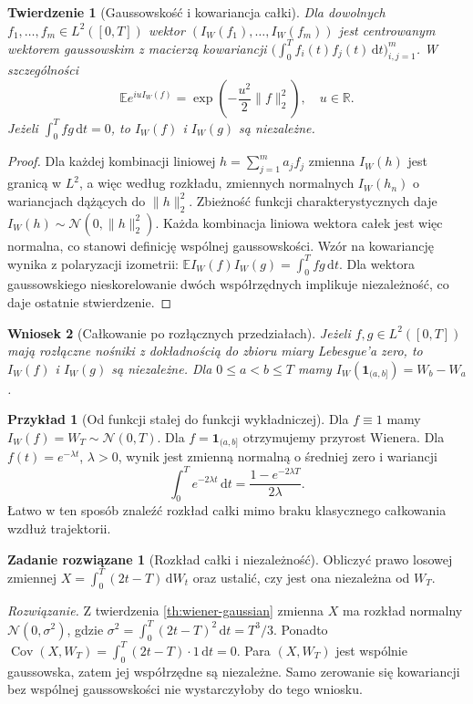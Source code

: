 \documentclass[11pt,a4paper,oneside]{report}
\numberwithin{equation}{chapter}
\theoremstyle{plain}
\newtheorem{twierdzenie}{Twierdzenie}[chapter]
\newtheorem{wniosek}[twierdzenie]{Wniosek}
\theoremstyle{definition}
\newtheorem{przyklad}{Przykład}[chapter]
\newtheorem{zadanie}{Zadanie rozwiązane}[chapter]
\theoremstyle{remark}
\newcommand{\R}{\mathbb{R}}
\newcommand{\E}{\mathbb{E}}
\newcommand{\Cov}{\operatorname{Cov}}
\newcommand{\ind}[1]{\mathbf{1}_{#1}}
\newcommand{\dd}{\mathrm{d}}
\newcommand{\norm}[1]{\lVert #1\rVert}
\newcommand{\Normal}{\mathcal{N}}
\begin{document}
\begin{twierdzenie}[Gaussowskość i kowariancja całki]\label{thm:volIII:01:03}\label{th:wiener-gaussian}
Dla dowolnych $f_1,\ldots,f_m\in L^2([0,T])$ wektor
$(I_W(f_1),\ldots,I_W(f_m))$ jest centrowanym wektorem gaussowskim
z macierzą kowariancji
$\big(\int_0^T f_i(t)f_j(t)\,\dd t\big)_{i,j=1}^m$.
W szczególności
\[
\E e^{iuI_W(f)}=\exp\left(-\frac{u^2}{2}\norm{f}_2^2\right),
\quad u\in\R.
\tag{1.4}
\]
Jeżeli $\int_0^Tfg\,\dd t=0$, to $I_W(f)$ i $I_W(g)$
są niezależne.
\end{twierdzenie}
\begin{proof}
Dla każdej kombinacji liniowej $h=\sum_{j=1}^ma_jf_j$
zmienna $I_W(h)$ jest granicą w $L^2$, a więc według
rozkładu, zmiennych normalnych $I_W(h_n)$ o wariancjach
dążących do $\norm{h}_2^2$. Zbieżność funkcji
charakterystycznych daje $I_W(h)\sim\Normal(0,\norm{h}_2^2)$.
Każda kombinacja liniowa wektora całek jest więc normalna,
co stanowi definicję wspólnej gaussowskości. Wzór na kowariancję
wynika z polaryzacji izometrii:
$\E I_W(f)I_W(g)=\int_0^Tfg\,\dd t$.
Dla wektora gaussowskiego nieskorelowanie dwóch współrzędnych
implikuje niezależność, co daje ostatnie stwierdzenie.
\end{proof}

\begin{wniosek}[Całkowanie po rozłącznych przedziałach]\label{cor:volIII:01:01}
Jeżeli $f,g\in L^2([0,T])$ mają rozłączne nośniki z dokładnością
do zbioru miary Lebesgue'a zero, to $I_W(f)$ i $I_W(g)$
są niezależne. Dla $0\le a<b\le T$ mamy
$I_W(\ind{(a,b]})=W_b-W_a$.
\end{wniosek}

\begin{przyklad}[Od funkcji stałej do funkcji wykładniczej]
Dla $f\equiv1$ mamy $I_W(f)=W_T\sim\Normal(0,T)$.
Dla $f=\ind{(a,b]}$ otrzymujemy przyrost Wienera.
Dla $f(t)=e^{-\lambda t}$, $\lambda>0$, wynik jest
zmienną normalną o średniej zero i wariancji
\[
\int_0^Te^{-2\lambda t}\,\dd t
=\frac{1-e^{-2\lambda T}}{2\lambda}.
\]
Łatwo w ten sposób znaleźć rozkład całki mimo braku
klasycznego całkowania wzdłuż trajektorii.
\end{przyklad}

\begin{zadanie}[Rozkład całki i niezależność]
Obliczyć prawo losowej zmiennej
$X=\int_0^T(2t-T)\,\dd W_t$ oraz ustalić,
czy jest ona niezależna od $W_T$.

\emph{Rozwiązanie.}
Z twierdzenia \ref{th:wiener-gaussian} zmienna $X$ ma rozkład
normalny $\Normal(0,\sigma^2)$, gdzie
$\sigma^2=\int_0^T(2t-T)^2\,\dd t=T^3/3$.
Ponadto
$\Cov(X,W_T)=\int_0^T(2t-T)\cdot1\,\dd t=0$.
Para $(X,W_T)$ jest wspólnie gaussowska, zatem jej
współrzędne są niezależne. Samo zerowanie się kowariancji
bez wspólnej gaussowskości nie wystarczyłoby do tego wniosku.
\end{zadanie}
\end{document}
